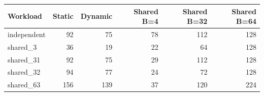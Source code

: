 \begin{tabular}{lrrrrr}
\toprule
Workload & Static & Dynamic & Shared B=4 & Shared B=32 & Shared B=64\\
\midrule
independent & 92 & 75 & 78 & 112 & 128 \\
shared\_3 & 36 & 19 & 22 & 64 & 128 \\
shared\_31 & 92 & 75 & 29 & 112 & 128 \\
shared\_32 & 94 & 77 & 24 & 72 & 128 \\
shared\_63 & 156 & 139 & 37 & 120 & 224 \\
\bottomrule
\end{tabular}
